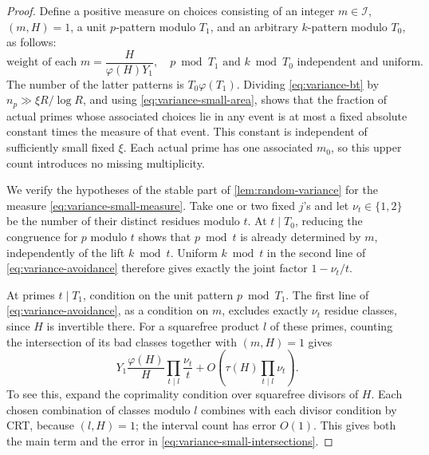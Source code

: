 \begin{proof}
Define a positive measure on choices consisting of an integer
\(m\in\mathcal I\), \((m,H)=1\), a unit \(p\)-pattern modulo \(T_1\),
and an arbitrary \(k\)-pattern modulo \(T_0\), as follows:
\begin{equation}\label{eq:variance-small-measure}
 \text{weight of each }m=\frac{H}{\varphi(H)Y_1},
 \quad
 p\bmod T_1\text{ and }k\bmod T_0
 \text{ independent and uniform}.
\end{equation}
The number of the latter patterns is \(T_0\varphi(T_1)\).
Dividing \eqref{eq:variance-bt} by
\(n_p\gg\xi R/\log R\), and using
\eqref{eq:variance-small-area}, shows that the fraction of actual primes
whose associated choices lie in any event is at most a fixed absolute
constant times the measure of that event. This constant is independent
of sufficiently small fixed \(\xi\). Each actual prime has one associated
\(m_0\), so this upper count introduces no missing multiplicity.

We verify the hypotheses of the stable part of
\cref{lem:random-variance} for the measure
\eqref{eq:variance-small-measure}.
Take one or two fixed \(j\)'s and let \(\nu_t\in\{1,2\}\) be the number of
their distinct residues modulo \(t\).
At \(t\mid T_0\), reducing the congruence for \(p\) modulo \(t\) shows
that \(p\bmod t\) is already determined by \(m\), independently of the
lift \(k\bmod t\). Uniform \(k\bmod t\) in the second line of
\eqref{eq:variance-avoidance} therefore gives exactly the joint factor
\(1-\nu_t/t\).

At primes \(t\mid T_1\), condition on the unit pattern \(p\bmod T_1\).
The first line of \eqref{eq:variance-avoidance}, as a condition on \(m\),
excludes exactly \(\nu_t\) residue classes, since \(H\) is invertible
there. For a squarefree product \(l\) of these primes, counting the
intersection of its bad classes together with \((m,H)=1\) gives
\begin{equation}\label{eq:variance-small-intersections}
 Y_1\frac{\varphi(H)}H\prod_{t\mid l}\frac{\nu_t}{t}
 +O\left(\tau(H)\prod_{t\mid l}\nu_t\right).
\end{equation}
To see this, expand the coprimality condition over squarefree divisors of
\(H\). Each chosen combination of classes modulo \(l\) combines with
each divisor condition by CRT, because \((l,H)=1\); the interval count
has error \(O(1)\). This gives both the main term and the error in
\eqref{eq:variance-small-intersections}.


\end{proof}
